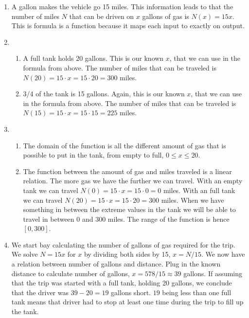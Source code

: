 \begin{enumerate}[label = (\alph*)]
  \item
    A gallon makes the vehicle go 15 miles. This information leads to that the number of miles $ N $ that can be driven on $ x $ gallons of gas is $ N(x) = 15x $. This is formula is a function because it maps each input to exactly on output.
  \item
    \begin{enumerate}[label = (\roman*)]
      \item
        A full tank holds 20 gallons. This is our known $ x $, that we can use in the formula from above. The number of miles that can be traveled is $ N(20) = 15 \cdot x = 15 \cdot 20 = 300 $ miles.
      \item
        3/4 of the tank is 15 gallons. Again, this is our known $ x $, that we can use in the formula from above. The number of miles that can be traveled is $ N(15) = 15 \cdot x = 15 \cdot 15 = 225 $ miles.
    \end{enumerate}
  \item
    \begin{enumerate}[label = (\roman*)]
      \item
        The domain of the function is all the different amount of gas that is possible to put in the tank, from empty to full, $ 0 \le x \le 20 $.
      \item
        The function between the amount of gas and miles traveled is a linear relation. The more gas we have the further we can travel. With an empty tank we can travel $ N(0) = 15 \cdot x = 15 \cdot 0 = 0 $ miles. With an full tank we can travel $ N(20) = 15 \cdot x = 15 \cdot 20 = 300 $ miles. When we have something in between the extreme values in the tank we will be able to travel in between 0 and 300 miles. The range of the function is hence $ [0,300] $.
    \end{enumerate}
  \item
    We start bay calculating the number of gallons of gas required for the trip. We solve $ N = 15x $ for $ x $ by dividing both sides by 15, $ x = N/15 $. We now have a relation between number of gallons and distance. Plug in the known distance to calculate number of gallons, $ x = 578 / 15 \approx 39 $ gallons. If assuming that the trip was started with a full tank, holding 20 gallons, we conclude that the driver was $ 39 - 20 = 19 $ gallons short. $ 19 $ being less than one full tank means that driver had to stop at least one time during the trip to fill up the tank.
\end{enumerate}

